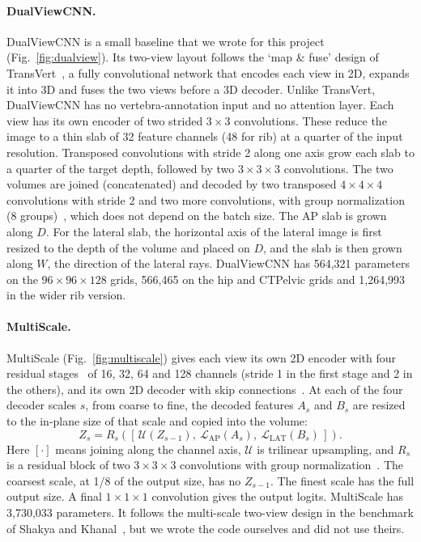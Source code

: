 \documentclass[11pt]{article}
\newcommand{\AP}{\mathrm{AP}}
\newcommand{\LAT}{\mathrm{LAT}}
\begin{document}
\paragraph{DualViewCNN.}
DualViewCNN is a small baseline that we wrote for this project (Fig.~\ref{fig:dualview}). Its two-view layout follows the `map \& fuse' design of TransVert~\cite{bayat2020}, a fully convolutional network that encodes each view in 2D, expands it into 3D and fuses the two views before a 3D decoder. Unlike TransVert, DualViewCNN has no vertebra-annotation input and no attention layer. Each view has its own encoder of two strided $3\times3$ convolutions. These reduce the image to a thin slab of 32 feature channels (48 for rib) at a quarter of the input resolution. Transposed convolutions with stride 2 along one axis grow each slab to a quarter of the target depth, followed by two $3\times3\times3$ convolutions. The two volumes are joined (concatenated) and decoded by two transposed $4\times4\times4$ convolutions with stride 2 and two more convolutions, with group normalization (8 groups)~\cite{wu2018}, which does not depend on the batch size. The AP slab is grown along $D$. For the lateral slab, the horizontal axis of the lateral image is first resized to the depth of the volume and placed on $D$, and the slab is then grown along $W$, the direction of the lateral rays. DualViewCNN has 564,321 parameters on the $96\times96\times128$ grids, 566,465 on the hip and CTPelvic grids and 1,264,993 in the wider rib version.

\paragraph{MultiScale.}
MultiScale (Fig.~\ref{fig:multiscale}) gives each view its own 2D encoder with four residual stages~\cite{he2016} of 16, 32, 64 and 128 channels (stride 1 in the first stage and 2 in the others), and its own 2D decoder with skip connections~\cite{ronneberger2015}. At each of the four decoder scales $s$, from coarse to fine, the decoded features $A_s$ and $B_s$ are resized to the in-plane size of that scale and copied into the volume:
\begin{equation}
Z_s=R_s\!\left(\left[\,\mathcal{U}(Z_{s-1}),\ \mathcal{L}_\AP(A_s),\ \mathcal{L}_\LAT(B_s)\,\right]\right).
\label{eq:multiscale}
\end{equation}
Here $[\cdot]$ means joining along the channel axis, $\mathcal{U}$ is trilinear upsampling, and $R_s$ is a residual block of two $3\times3\times3$ convolutions with group normalization~\cite{wu2018}. The coarsest scale, at 1/8 of the output size, has no $Z_{s-1}$. The finest scale has the full output size. A final $1\times1\times1$ convolution gives the output logits. MultiScale has 3,730,033 parameters. It follows the multi-scale two-view design in the benchmark of Shakya and Khanal~\cite{shakya2023}, but we wrote the code ourselves and did not use theirs.
\end{document}
